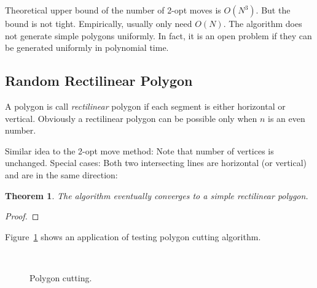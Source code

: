 \documentclass{acm_proc_article-sp}          %
\newtheorem{theorem}{Theorem}
\begin{document}
Theoretical upper bound of the number of 2-opt moves is $O(N^3)$. But
the bound is not tight. Empirically, usually only need $O(N)$. 
The algorithm does not generate simple polygons uniformly.
In fact, it is an open problem if they can be generated uniformly in
polynomial time.


\subsection{Random Rectilinear Polygon}
A polygon is call \emph{rectilinear} polygon if each
segment is either horizontal or vertical. Obviously a rectilinear
polygon can be possible only when $n$ is an even number.

Similar idea to the 2-opt move method:
Note that number of vertices is unchanged.
Special cases: Both two intersecting lines are horizontal (or
vertical) and are in the same direction:



\begin{theorem}
The algorithm eventually converges to a simple rectilinear polygon.
\end{theorem}
\begin{proof}
\end{proof}

Figure~\ref{fig:polygon_cutting} shows an application of testing
polygon cutting algorithm.

\begin{figure}[ht]
  \centering
  \\
  \caption{Polygon cutting.}\label{fig:polygon_cutting}
\end{figure}
\end{document}

